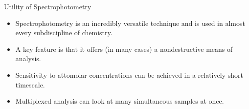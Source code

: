 \documentclass[notes=only]{beamer}
\begin{document}



\begin{frame}{Utility of Spectrophotometry}
	\begin{itemize}
		\item Spectrophotometry is an incredibly versatile technique and
			is used in almost every subdiscipline of chemistry.
		\item A key feature is that it offers (in many cases) a
			\alert{nondestructive} means of analysis.
		\item Sensitivity to \alert{attomolar} concentrations
			can be achieved in a relatively short timescale.
		\item \alert{Multiplexed} analysis can look at many simultaneous
			samples at once.
	\end{itemize}
\end{frame}
\end{document}
